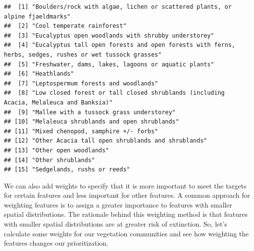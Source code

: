 \documentclass[
  12pt,
]{book}
\begin{document}
\begin{verbatim}
##  [1] "Boulders/rock with algae, lichen or scattered plants, or alpine fjaeldmarks"                           
##  [2] "Cool temperate rainforest"                                                                             
##  [3] "Eucalyptus open woodlands with shrubby understorey"                                                    
##  [4] "Eucalyptus tall open forests and open forests with ferns, herbs, sedges, rushes or wet tussock grasses"
##  [5] "Freshwater, dams, lakes, lagoons or aquatic plants"                                                    
##  [6] "Heathlands"                                                                                            
##  [7] "Leptospermum forests and woodlands"                                                                    
##  [8] "Low closed forest or tall closed shrublands (including Acacia, Melaleuca and Banksia)"                 
##  [9] "Mallee with a tussock grass understorey"                                                               
## [10] "Melaleuca shrublands and open shrublands"                                                              
## [11] "Mixed chenopod, samphire +/- forbs"                                                                    
## [12] "Other Acacia tall open shrublands and shrublands"                                                      
## [13] "Other open woodlands"                                                                                  
## [14] "Other shrublands"                                                                                      
## [15] "Sedgelands, rushs or reeds"
\end{verbatim}

We can also add weights to specify that it is more important to meet the targets for certain features and less important for other features. A common approach for weighting features is to assign a greater importance to features with smaller spatial distributions. The rationale behind this weighting method is that features with smaller spatial distributions are at greater risk of extinction. So, let's calculate some weights for our vegetation communities and see how weighting the features changes our prioritization.
\end{document}
